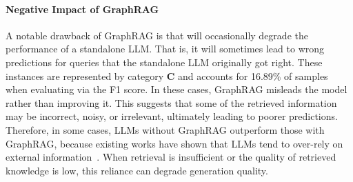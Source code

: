 \documentclass[11pt]{article}
\newcommand{\jt}[1]{{\color{red}[JT:#1]}}
\begin{document}
\paragraph{Negative Impact of GraphRAG}  
A notable drawback of GraphRAG is that will occasionally 
degrade the performance of a standalone LLM. That is, it will sometimes lead to wrong predictions for queries that the standalone LLM originally got right. These instances are represented by category {\bf C} and accounts for 16.89\% of samples when evaluating via the F1 score. 
In these cases, GraphRAG misleads the model rather than improving it. This suggests that some of the retrieved information may be incorrect, noisy, or irrelevant, ultimately leading to poorer predictions. Therefore, in some cases, LLMs without GraphRAG outperform those with GraphRAG,  because existing works have shown that LLMs tend to over-rely on external information~\cite{ren2023investigating,tan2024blinded,wang2023self,ni2024llms,zeng2024good}. When retrieval is insufficient or the quality of retrieved knowledge is low, this reliance can degrade generation quality.

\end{document}
